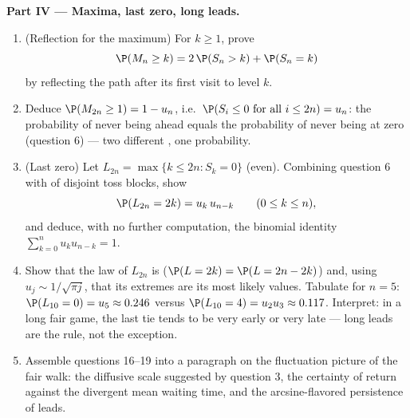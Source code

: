 \begin{problem}
\medskip
\noindent\textbf{Part IV --- Maxima, last zero, long leads.}
\begin{enumerate}[resume]
  \item (Reflection for the maximum) For $k \geq 1$, prove
        \[
        \P(M_n \geq k) = 2\,\P(S_n > k) + \P(S_n = k)
        \]
        by reflecting the path after its first visit to
        level $k$.
  \item Deduce $\P(M_{2n} \geq 1) = 1 - u_n$, i.e.\
        $\P(S_i \leq 0 \text{ for all } i \leq 2n) = u_n$:
        the probability of never being ahead equals the
        probability of never being at zero (question 6) ---
        two different , one probability.
  \item (Last zero) Let $L_{2n} = \max\{k \leq 2n : S_k =
        0\}$ (even). Combining question 6 with 
        of disjoint toss blocks, show
        \[
        \P(L_{2n} = 2k) = u_k\,u_{n-k}
        \qquad (0 \leq k \leq n),
        \]
        and deduce, with no further computation, the binomial
        identity $\sum_{k=0}^n u_ku_{n-k} = 1$.
  \item Show that the law of $L_{2n}$ is  ($\P(L =
        2k) = \P(L = 2n - 2k)$) and, using $u_j \sim
        1/\sqrt{\pi j}$, that its extremes are its most
        likely values. Tabulate for $n = 5$: $\P(L_{10} = 0)
        = u_5 \approx 0.246$ versus $\P(L_{10} = 4) = u_2u_3
        \approx 0.117$. Interpret: in a long fair game, the
        last tie tends to be very early or very late ---
        long leads are the rule, not the exception.
  \item Assemble questions 16--19 into a paragraph on the
        fluctuation picture of the fair walk: the diffusive
        scale suggested by question 3, the certainty of
        return against the divergent mean waiting time, and
        the arcsine-flavored persistence of leads.
\end{enumerate}


\end{problem}

